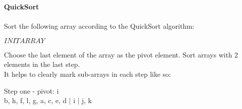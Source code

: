 \textbf{\LARGE{\color{tumgadRed}QuickSort}}\\
\\
\noindent
Sort the following array according to the QuickSort algorithm:
\begin{center}
    $INITARRAY$
\end{center}
Choose the last element of the array as the pivot element. Sort arrays with 2 elements in the last step.\\
It helps to clearly mark sub-arrays in each step like so:
\noindent
\begin{center}
    Step one - pivot: i\\
    b, h, f, l, g, a, c, e, d $|$ i $|$ j, k\\
    \vspace{10px}
\end{center}
\noindent\fbox{
    \parbox{\textwidth}{
        \vspace{10px}
    }
}
